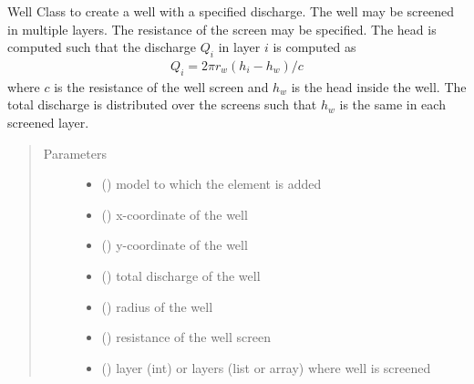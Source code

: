\documentclass[letterpaper,10pt,english]{sphinxmanual}
\begin{document}
\begin{fulllineitems}
\label{\detokenize{wells/well:timml.well.Well}}
Well Class to create a well with a specified discharge. The well
may be screened in multiple layers. The resistance of the screen may
be specified. The head is computed such that the discharge \(Q_i\)
in layer \(i\) is computed as
\begin{equation*}
\begin{split}Q_i = 2\pi r_w(h_i - h_w)/c\end{split}
\end{equation*}
where \(c\) is the resistance of the well screen and \(h_w\) is
the head inside the well. The total discharge is distributed over the
screens such that \(h_w\) is the same in each screened layer.
\begin{quote}\begin{description}
\item[{Parameters}] \leavevmode\begin{itemize}
\item {} 
 () \textendash{} model to which the element is added

\item {} 
 () \textendash{} x-coordinate of the well

\item {} 
 () \textendash{} y-coordinate of the well

\item {} 
 () \textendash{} total discharge of the well

\item {} 
 () \textendash{} radius of the well

\item {} 
 () \textendash{} resistance of the well screen

\item {} 
 (\sphinxstyleliteralemphasis{, }) \textendash{} layer (int) or layers (list or array) where well is screened


\end{itemize}
\end{description}
\end{quote}
\end{fulllineitems}
\end{document}
